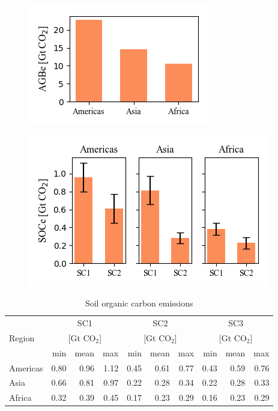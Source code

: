 	    \begin{figure}[ht]
		    \centering
			\includegraphics[scale=1]{img/agbe}
			\caption[Ecosystem service values]{}
			\label{fig:agbe}
	    \end{figure}
	    \begin{figure}[ht]
		    \centering
		    \includegraphics[scale=1]{img/soce}
		    \caption[Ecosystem service values]{}
		    \label{fig:soce}
	    \end{figure}


	    \begin{table}[ht]
		    \centering
		    \caption[Soil organic carbon emissions]{Soil organic carbon emissions}
		    \label{tab:soce_tab}
		    \begin{tabular}{lrrrrrrrrr}
			    \hline
			    \multirow{3}{*}{Region} & \multicolumn{3}{c}{SC1}& \multicolumn{3}{c}{SC2} & \multicolumn{3}{c}{SC3} \\
			    & \multicolumn{3}{c}{[Gt CO$_2$]}& \multicolumn{3}{c}{[Gt CO$_2$]} & \multicolumn{3}{c}{[Gt CO$_2$]} \\
			    & min & mean & max & min & mean & max & min & mean & max \\\hline
			    Americas & 0.80 & 0.96 & 1.12 & 0.45 & 0.61 & 0.77 & 0.43 & 0.59 & 0.76 \\
			    Asia & 0.66 & 0.81 & 0.97 & 0.22 & 0.28 & 0.34 & 0.22 & 0.28 & 0.33 \\
			    Africa & 0.32 & 0.39 & 0.45 & 0.17 & 0.23 & 0.29 & 0.16 & 0.23 & 0.29 \\\hline
		    \end{tabular}
	    \end{table}

